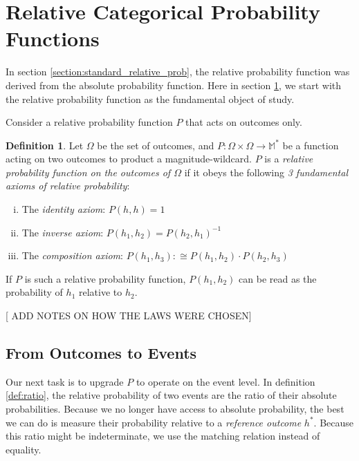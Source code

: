 \documentclass[twoside]{article}
\theoremstyle{plain}%
\theoremstyle{definition}
\newtheorem{definition}{Definition}[section]
\theoremstyle{remark}
\begin{document}
\section{Relative Categorical Probability Functions}
\label{section:new_relative_prob}

In section \ref{section:standard_relative_prob}, the relative probability function was derived from the absolute probability function. Here in section \ref{section:new_relative_prob}, we start with the relative probability function as the fundamental object of study.

Consider a relative probability function \(P\) that acts on outcomes only.

\begin{definition}
\label{def:fundamental_laws}
Let \(\Omega\) be the set of outcomes, and \(P: \Omega \times \Omega \rightarrow \mathbb{M}^*\) be a function acting on two outcomes to product a magnitude-wildcard. \(P\) is a \textit{relative probability function on the outcomes of \(\Omega\)} if it obeys the following \textit{3 fundamental axioms of relative probability}:

\begin{enumerate}[(i)]
\item The \textit{identity axiom}: \(P(h, h) = 1\)
\item The \textit{inverse axiom}: \(P(h_1, h_2) = P(h_2, h_1)^{-1}\)
\item The \textit{composition axiom}: \(P(h_1, h_3) :\cong P(h_1, h_2) \cdot P(h_2, h_3)\)
\end{enumerate}

\end{definition}

If \(P\) is such a relative probability function, \(P(h_1, h_2)\) can be read as the probability of \(h_1\) relative to \(h_2\).


[ ADD NOTES ON HOW THE LAWS WERE CHOSEN]

\subsection{From Outcomes to Events}

Our next task is to upgrade \(P\) to operate on the event level. In definition \ref{def:ratio}, the relative probability of two events are the ratio of their absolute probabilities. Because we no longer have access to absolute probability, the best we can do is measure their probability relative to a \textit{reference outcome} \(h^*\). Because this ratio might be indeterminate, we use the matching relation instead of equality.
\end{document}
